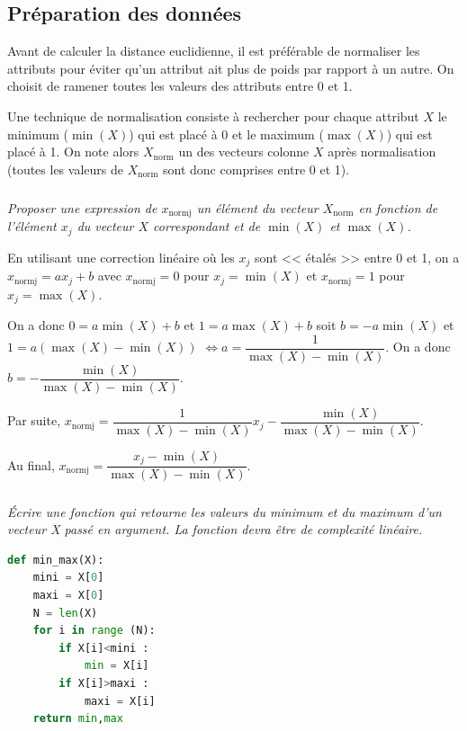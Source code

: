 \subsection*{Préparation des données}

\ifprof
\else
Avant de calculer la distance euclidienne, il est préférable de normaliser les attributs pour éviter qu’un
attribut ait plus de poids par rapport à un autre. On choisit de ramener toutes les valeurs des attributs
entre 0 et 1.

Une technique de normalisation consiste à rechercher pour chaque attribut $X$ le minimum ($\min(X)$)
qui est placé à 0 et le maximum ($\max(X)$) qui est placé à 1. On note alors $X_{\text{norm}}$ un des vecteurs
colonne $X$ après normalisation (toutes les valeurs de $X_{\text{norm}}$ sont donc comprises entre 0 et 1).
\fi

\subparagraph{}\textit{Proposer une expression de $x_{\text{normj}}$ un élément du vecteur $X_{\text{norm}}$ en fonction de l’élément $x_j$ du
vecteur $X$ correspondant et de $\min(X)$ et $\max(X)$.}
\ifprof
\begin{corrige}
En utilisant une correction linéaire où les $x_j$ sont << étalés >> entre 0 et 1, on a 
$x_{\text{normj}} =a x_j + b $ avec $x_{\text{normj}}=0$ pour $x_j =\min(X)$ et  $x_{\text{normj}}=1$ pour $x_j =\max(X)$. 

On a donc $0 =a\min(X)+ b $ et $1 =a \max(X) + b $ soit $b =-a\min(X) $ et $1 =a \left(\max(X)-\min(X)\right) $ $\Leftrightarrow a= \dfrac{1}{\max(X)-\min(X)} $. On a donc $b =-\dfrac{\min(X)}{\max(X)-\min(X)} $.


Par suite, $x_{\text{normj}} = \dfrac{1}{\max(X)-\min(X)} x_j -\dfrac{\min(X)}{\max(X)-\min(X)}$.

Au final,  $x_{\text{normj}} = \dfrac{ x_j -\min(X)}{\max(X)-\min(X)}$.
\end{corrige}
\else
\fi

\subparagraph{}\textit{Écrire une fonction  qui retourne les valeurs du minimum et du maximum d’un vecteur X passé en argument. La fonction devra être de complexité linéaire.}
\ifprof
\begin{corrige}
\begin{lstlisting}[language=Python]
def min_max(X):
    mini = X[0]
    maxi = X[0]
    N = len(X)
    for i in range (N):
        if X[i]<mini :
            min = X[i]
        if X[i]>maxi :
            maxi = X[i]
    return min,max
\end{lstlisting}
\end{corrige}
\else
\fi

